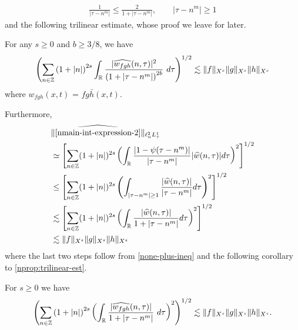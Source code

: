 %
\begin{equation}
	\label{none-plus-ineq}
	\begin{split}
		\frac{1}{|\tau - n^{m}| } \le \frac{2}{1 + |\tau - n^{m}| }, 
		\qquad |\tau - n^{m}| \ge 1
	\end{split}
\end{equation}
%
%
and the following trilinear estimate, whose proof we leave for later.
%
%
%
%
%
%
%
%
\begin{proposition}
\label{nprop:trilinear-est}
	For any $s \ge 0$ and $b \ge 3/8$, we have
	\begin{equation}
		\left( \sum_{n \in \mathbb{Z}} \left (1 + |n| \right )^{2s} \int_{\mathbb{R}}
		\frac{|\widehat{w_{fgh}}(n, \tau) |^2}{\left (1+ |\tau - 
    n^{m}| \right )^{2b}} 
		 \ d \tau 
		\right)^{1/2}
		\lesssim \|f\|_{X^s} \|g\|_{X^s}\|h\|_{X^s}
	\end{equation}
	where $w_{fgh}(x,t)$ = $fg \bar h (x,t)$.
%
%
%
%
\end{proposition}
%
%
Furthermore,
%
%
%
%
\begin{equation}
	\label{nmain-int-expression-2-Y-s-part}
	\begin{split}
    & \| \widehat{\eqref{nmain-int-expression-2}}\|_{\ell^{2}_{n}L^{1}_{\tau}}
		\\
    & \simeq \left[ \sum_{n \in \mathbb{Z}}(1 + | n |)^{2s} \left(
		\int_{\mathbb{R}}\frac{|1 - \psi(\tau - n^{m})|}{|\tau - n^{m}|} |\widehat{w}(n, \tau)| d
		\tau \right)^{2} \right]^{1/2}
		\\
    & \le \left[ \sum_{n \in \mathbb{Z}}(1 + | n |)^{2s} \left(
    \int_{| \tau - n^{m} | \ge 1 }\frac{|\widehat{w}(n, \tau)|}{|\tau - n^{m}|}  d
		\tau \right)^{2} \right]^{1/2}
    \\
    & \lesssim \left[ \sum_{n \in \mathbb{Z}}(1 + | n |)^{2s} \left(
    \int_{\mathbb{R}}\frac{|\widehat{w}(n, \tau)|}{1 + |\tau - n^{m}|}  d
		\tau \right)^{2} \right]^{1/2}
    \\
		& \lesssim \|f\|_{X^s} \|g\|_{X^s}\|h\|_{X^s}
	\end{split}
\end{equation}
%
%
where the last two steps follow from \eqref{none-plus-ineq} and the following
corollary to \cref{nprop:trilinear-est}.
%
%
%
%
%
%
%
%
\begin{corollary}
\label{ncor:trilinear-estimate2}
	For $s \ge 0$ we have
%
%
\begin{equation}
	\label{ntrilinear-estimate2}
	\begin{split}
		\left( \sum_{n \in \mathbb{Z}} \left (1 + |n| \right )^{2s}  \left ( \int_{\mathbb{R}} 
		\frac{|\widehat{w_{fgh}}(n, \tau) |}{1 + | \tau - n^{m } |}
		 \ d\tau \right)^2  \right)^{1/2} \lesssim \|f\|_{X^s} \|g\|_{X^s}\|h\|_{X^s}.
	\end{split}
\end{equation}
\end{corollary}
